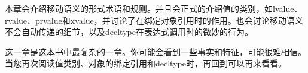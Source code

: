 本章会介绍移动语义的形式术语和规则。并且会正式的介绍值的类别，如lvalue、rvalue、prvalue和xvalue，并讨论了在绑定对象引用时的作用。也会讨论移动语义不会自动传递的细节，以及decltype在表达式调用时的微妙的行为。\par

这一章是这本书中最复杂的一章。你可能会看到一些事实和特征，可能很难相信。当您再次阅读值类别、对象的绑定引用和decltype时，再回到可以再来看看。\par